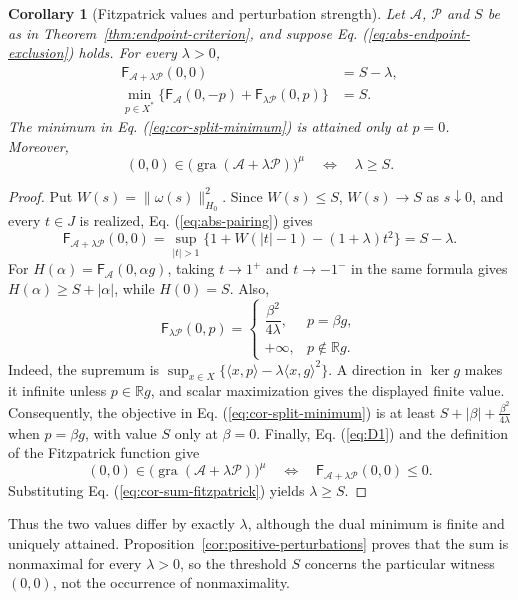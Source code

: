 \documentclass[11pt]{article}
\newcommand{\R}{\mathbb R}
\newcommand{\gra}{\operatorname{gra}}
\newcommand{\pair}[2]{\langle #1,#2\rangle}
\newtheorem{corollary}{Corollary}
\theoremstyle{definition}
\theoremstyle{remark}
\begin{document}
\begin{corollary}[Fitzpatrick values and perturbation strength]
\label{cor:fitzpatrick-values}
Let $\mathcal A$, $\mathcal P$ and $S$ be as in Theorem~\ref{thm:endpoint-criterion}, and suppose Eq. (\ref{eq:abs-endpoint-exclusion}) holds. For every $\lambda>0$,
\begin{align}
\mathsf F_{\mathcal A+\lambda\mathcal P}(0,0)&=S-\lambda,\label{eq:cor-sum-fitzpatrick}\\
\min_{p\in X^*}\{\mathsf F_{\mathcal A}(0,-p)+\mathsf F_{\lambda\mathcal P}(0,p)\}&=S.\label{eq:cor-split-minimum}
\end{align}
The minimum in Eq. (\ref{eq:cor-split-minimum}) is attained only at $p=0$. Moreover,
\[
(0,0)\in\bigl(\gra(\mathcal A+\lambda\mathcal P)\bigr)^\mu
\quad\Longleftrightarrow\quad \lambda\ge S.
\]
\end{corollary}
\begin{proof}
Put $W(s)=\|\omega(s)\|_{H_0}^2$. Since $W(s)\le S$, $W(s)\to S$ as $s\downarrow0$, and every $t\in J$ is realized, Eq. (\ref{eq:abs-pairing}) gives
\[
\mathsf F_{\mathcal A+\lambda\mathcal P}(0,0)
=\sup_{|t|>1}\{1+W(|t|-1)-(1+\lambda)t^2\}=S-\lambda.
\]
For $H(\alpha)=\mathsf F_{\mathcal A}(0,\alpha g)$, taking $t\to1^+$ and $t\to-1^-$ in the same formula gives $H(\alpha)\ge S+|\alpha|$, while $H(0)=S$. Also,
\[
\mathsf F_{\lambda\mathcal P}(0,p)=
\begin{cases}
\dfrac{\beta^2}{4\lambda},&p=\beta g,\\
+\infty,&p\notin\R g.
\end{cases}
\]
Indeed, the supremum is $\sup_{x\in X}\{\pair{x}{p}-\lambda\pair{x}{g}^2\}$. A direction in $\ker g$ makes it infinite unless $p\in\R g$, and scalar maximization gives the displayed finite value. Consequently, the objective in Eq. (\ref{eq:cor-split-minimum}) is at least $S+|\beta|+\frac{\beta^2}{4\lambda}$ when $p=\beta g$, with value $S$ only at $\beta=0$. Finally, Eq. (\ref{eq:D1}) and the definition of the Fitzpatrick function give
\[
(0,0)\in\bigl(\gra(\mathcal A+\lambda\mathcal P)\bigr)^\mu
\quad\Longleftrightarrow\quad
\mathsf F_{\mathcal A+\lambda\mathcal P}(0,0)\le0.
\]
Substituting Eq. (\ref{eq:cor-sum-fitzpatrick}) yields $\lambda\ge S$.
\end{proof}

Thus the two values differ by exactly $\lambda$, although the dual minimum is finite and uniquely attained. Proposition~\ref{cor:positive-perturbations} proves that the sum is nonmaximal for every $\lambda>0$, so the threshold $S$ concerns the particular witness $(0,0)$, not the occurrence of nonmaximality. 
\end{document}
